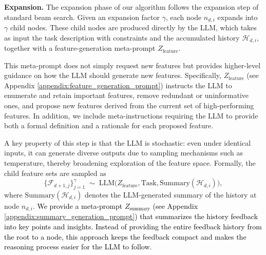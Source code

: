  





\textbf{Expansion.} The expansion phase of our algorithm follows the expansion step of standard beam search. Given an expansion factor $\gamma$, each node $n_{d,i}$ expands into $\gamma$ child nodes. These child nodes are produced directly by the LLM, which takes as input the task description with constraints and the accumulated history $\mathcal{H}_{d,i}$, together with a feature-generation meta-prompt $Z_{\text{feature}}$.  

This meta-prompt does not simply request new features but provides higher-level guidance on how the LLM should generate new features. Specifically, $Z_{\text{feature}}$ (see Appendix \ref{appendix:feature_generation_prompt}) instructs the LLM to enumerate and retain important features, remove redundant or uninformative ones, and propose new features derived from the current set of high-performing features. In addition, we include meta-instructions requiring the LLM to provide both a formal definition and a rationale for each proposed feature.  



A key property of this step is that the LLM is stochastic: even under identical inputs, it can generate diverse outputs due to sampling mechanisms such as temperature, thereby broadening exploration of the feature space. Formally, the child feature sets are sampled as
\[
\big\{ \mathcal{F}_{d+1,j} \big\}_{j=1}^{\gamma}
\;\sim\;
\text{LLM}\big(Z_{\text{feature}}, \text{Task}, \text{Summary}(\mathcal{H}_{d,i})\big),
\]
where $\text{Summary}(\mathcal{H}_{d,i})$ denotes the LLM-generated summary of the history at node $n_{d,i}$. \textcolor{black}{We provide a meta-prompt $Z_{\text{summary}}$ (see Appendix \ref{appendix:summary_generation_prompt}) that summarizes the history feedback into key points and insights. Instead of providing the entire feedback history from the root to a node, this approach keeps the feedback compact and makes the reasoning process easier for the LLM to follow.} 


  

